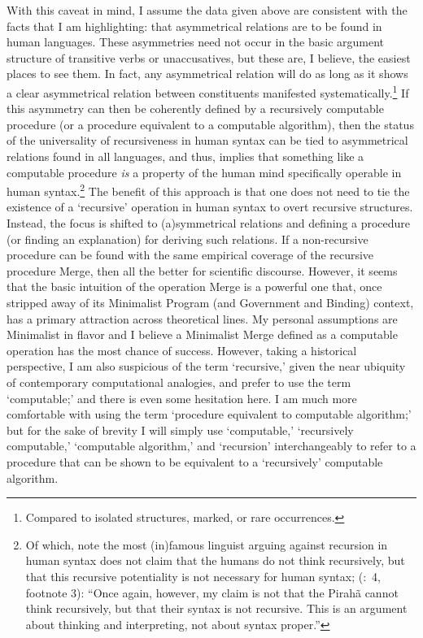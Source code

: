 \documentclass[11pt]{article}
\newcommand{\pgcitet}[2]{\citeauthor{#1} (\citeyear{#1}:~#2)}
\begin{document}
With this caveat in mind, I assume the data given above are consistent with the facts that I am highlighting: that asymmetrical relations are to be found in human languages. These asymmetries need not occur in the basic argument structure of transitive verbs or unaccusatives, but these are, I believe, the easiest places to see them. In fact, any asymmetrical relation will do as long as it shows a clear asymmetrical relation between constituents manifested systematically.\footnote{Compared to isolated structures, marked, or rare occurrences.} If this asymmetry can then be coherently defined by a recursively computable procedure (or a procedure equivalent to a computable algorithm), then the status of the universality of recursiveness in human syntax can be tied to asymmetrical relations found in all languages, and thus, implies that something like a computable procedure \textsl{is} a property of the human mind specifically operable in human syntax.\footnote{Of which, note the most (in)famous linguist arguing against recursion in human syntax does not claim that the humans do not think recursively, but that this recursive potentiality is not necessary for human syntax; \pgcitet{everett07replynevins}{4, footnote 3}: ``Once again, however, my claim is not that the Pirah\~a cannot think recursively, but that their syntax is not recursive. This is an argument about thinking and interpreting, not about syntax proper.''} The benefit of this approach is that one does not need to tie the existence of a `recursive' operation in human syntax to overt recursive structures. Instead, the focus is shifted to (a)symmetrical relations and defining a procedure (or finding an explanation) for deriving such relations. If a non-recursive procedure can be found with the same empirical coverage of the recursive procedure Merge, then all the better for scientific discourse. However, it seems that the basic intuition of the operation Merge is a powerful one that, once stripped away of its Minimalist Program (and Government and Binding) context, has a primary attraction across theoretical lines. My personal assumptions are Minimalist in flavor and I believe a Minimalist Merge defined as a computable operation has the most chance of success. However, taking a historical perspective, I am also suspicious of the term `recursive,' given the near ubiquity of contemporary computational analogies, and prefer to use the term `computable;' and there is even some hesitation here. I am much more comfortable with using the term `procedure equivalent to computable algorithm;' but for the sake of brevity I will simply use `computable,' `recursively computable,' `computable algorithm,' and `recursion' interchangeably to refer to a procedure that can be shown to be equivalent to a `recursively' computable algorithm.        
\end{document}
